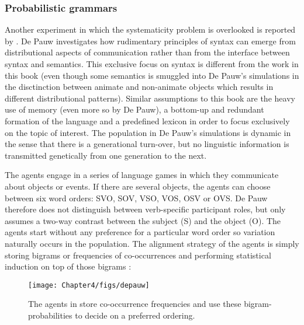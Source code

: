 \subsubsection{Probabilistic grammars}
 Another experiment in which the systematicity problem is overlooked is reported by \citet[chapter 10]{depauw02grael}. De Pauw investigates how rudimentary principles of syntax can emerge from distributional aspects of communication rather than from the interface between syntax and semantics. This exclusive focus on syntax is different from the work in this book (even though some semantics is smuggled into De Pauw's simulations in the disctinction between animate and non-animate objects which results in different distributional patterns). Similar assumptions to this book are the heavy use of memory (even more so by De Pauw), a bottom-up and redundant formation of the language and a predefined lexicon in order to focus exclusively on the topic of interest. The population in De Pauw's simulations is dynamic in the sense that there is a generational turn-over, but no linguistic information is transmitted genetically from one generation to the next.

The agents engage in a series of language games in which they communicate about objects or events. If there are several objects, the agents can choose between six word orders: SVO, SOV, VSO, VOS, OSV or OVS. De Pauw therefore does not distinguish between verb-specific participant roles, but only assumes a two-way contrast between the subject (S) and the object (O). The agents start without any preference for a particular word order so variation naturally occurs in the population. The alignment strategy of the agents is simply storing bigrams or frequencies of co-occurrences and performing statistical induction on top of those bigrams \citep[362]{depauw02grael}:

\begin{figure}[h]
\centerline{\texttt{[image: Chapter4/figs/depauw]}}
  \caption[Bigram probabilities \citep{depauw02grael}]{The agents in \citet{depauw02grael} store co-occurrence frequencies and use these bigram-probabilities to decide on a preferred ordering.}
   \label{f:depauw}
\end{figure}

